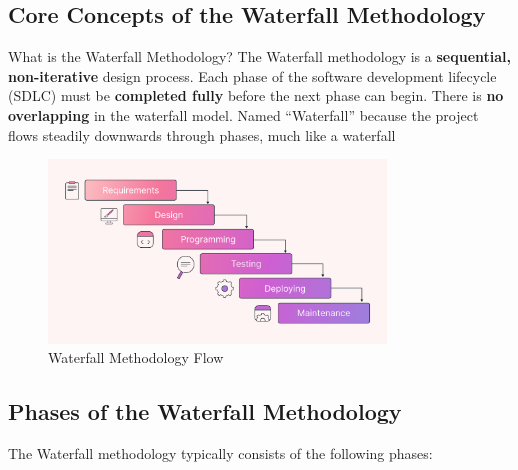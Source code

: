 \subsection{Core Concepts of the Waterfall Methodology}

\begin{conceptcard}{What is the Waterfall Methodology?}
  The Waterfall methodology is a \textbf{sequential, non-iterative} design process. Each phase of the software development lifecycle (SDLC) must be \textbf{completed fully} before the next phase can begin. There is \textbf{no overlapping} in the waterfall model. Named ``Waterfall'' because the project flows steadily downwards through phases, much like a waterfall
\end{conceptcard}

\begin{figure}[ht]
  \centering
  \includegraphics[width=0.8\textwidth]{images/waterfall_model.png}
  \caption{Waterfall Methodology Flow}
  \label{fig:waterfall_model}
\end{figure}

\subsection{Phases of the Waterfall Methodology}

The Waterfall methodology typically consists of the following phases:

